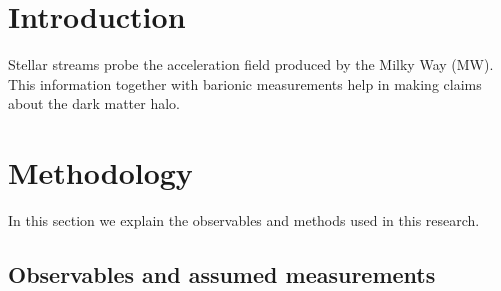 \documentclass[twocolumn]{aa}
\begin{document}
   \maketitle

\section{Introduction}

Stellar streams probe the acceleration field produced by the Milky Way (MW).
This information together with barionic measurements help in making claims about the
dark matter halo.

\section{Methodology}
In this section we explain the observables and methods used in this research.

\subsection{Observables and assumed measurements}
\label{sec:observables}
\end{document}
